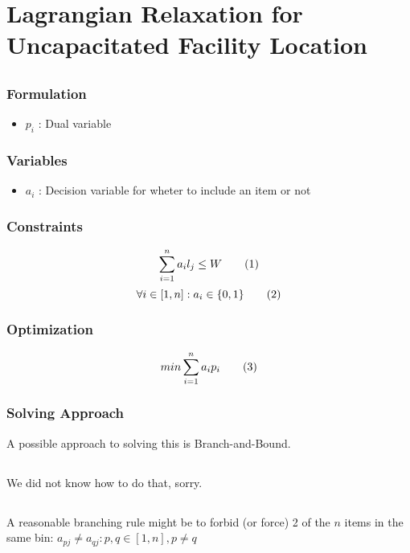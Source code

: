 \section{Lagrangian Relaxation for Uncapacitated Facility Location}

\subsection{ } 

\subsubsection{Formulation}

\begin{itemize}
	\item $p_i$ : Dual variable
\end{itemize}

\subsubsection{Variables}
\begin{itemize}
	\item $a_i$ : Decision variable for wheter to include an item or not
\end{itemize}

\subsubsection{Constraints}

\[ \sum^n_{i = 1}a_il_j \leq W \addtag \]
\[ \forall i \in [1,n] : a_i\in \{0,1\} \addtag \]

\subsubsection{Optimization}
\[ min \sum^n_{i = 1}a_ip_i \addtag \]

\subsubsection{Solving Approach}
A possible approach to solving this is Branch-and-Bound.

\subsection{ }  
We did not know how to do that, sorry.

\subsection{ } 
A reasonable branching rule might be to forbid (or force) 2 of the $n$ items in the same bin: $a_{pj} \neq a_{qj} : p,q \in [1,n], p \neq q$